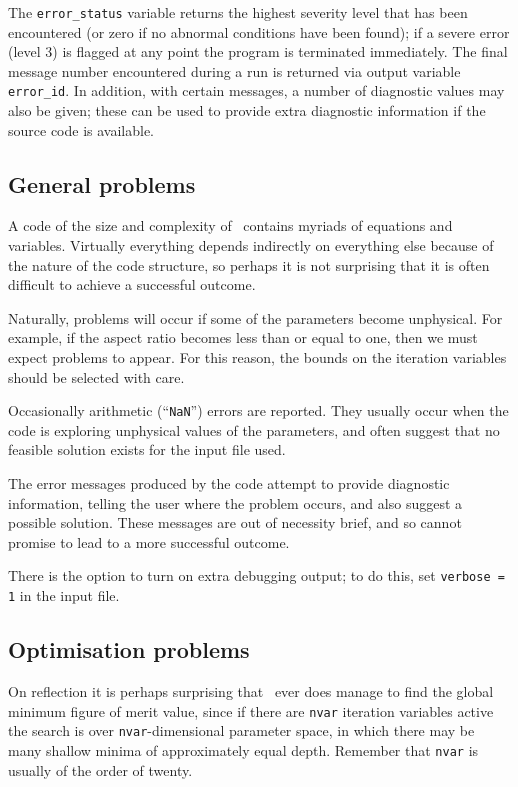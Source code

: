 The \texttt{error\_status} variable returns the highest severity level that
has been encountered (or zero if no abnormal conditions have been found); if a
severe error (level 3) is flagged at any point the program is terminated
immediately. The final message number encountered during a run is returned via
output variable \texttt{error\_id}. In addition, with certain messages, a
number of diagnostic values may also be given; these can be used to provide
extra diagnostic information if the source code is available.

\subsection{General problems}

A code of the size and complexity of \process\ contains myriads of equations
and variables. Virtually everything depends indirectly on everything else
because of the nature of the code structure, so perhaps it is not surprising
that it is often difficult to achieve a successful outcome.

Naturally, problems will occur if some of the parameters become unphysical.
For example, if the aspect ratio becomes less than or equal to one, then we
must expect problems to appear. For this reason, the bounds on the
iteration variables should be selected with care.

Occasionally arithmetic (``\texttt{NaN}'') errors are reported. They usually occur when the code is exploring unphysical values of the parameters, and often suggest that no feasible solution exists for the input file used.

The error messages produced by the code attempt to provide diagnostic
information, telling the user where the problem occurs, and also suggest a
possible solution. These messages are out of necessity brief, and so cannot
promise to lead to a more successful outcome.

There is the option to turn on extra debugging output; to do this, set \texttt{verbose = 1} in the input file.

\subsection{Optimisation problems}

On reflection it is perhaps surprising that \process\ ever does manage to
find the global minimum figure of merit value, since if there are
\texttt{nvar} iteration variables active the search is over
\texttt{nvar}-dimensional parameter space, in which there may be many shallow
minima of approximately equal depth. Remember that \texttt{nvar} is usually of
the order of twenty.

